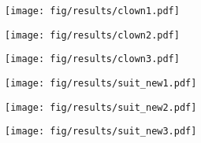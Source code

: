 \begin{figure*}
    \begin{subfigure}{0.33\linewidth}
        \begin{minipage}[t]{1.0\linewidth}
            \centering
            \texttt{[image: fig/results/clown1.pdf]}
        \end{minipage}
    \end{subfigure}
    \hfill
    \begin{subfigure}{0.33\linewidth}
        \begin{minipage}[t]{1.0\linewidth}
            \centering
            \texttt{[image: fig/results/clown2.pdf]}
        \end{minipage}
    \end{subfigure}
    \hfill
    \begin{subfigure}{0.33\linewidth}
        \begin{minipage}[t]{1.0\linewidth}
            \centering
            \texttt{[image: fig/results/clown3.pdf]}
        \end{minipage}
    \end{subfigure}

    \begin{subfigure}{0.33\linewidth}
        \begin{minipage}[t]{1.0\linewidth}
            \centering
            \texttt{[image: fig/results/suit\_new1.pdf]}
        \end{minipage}
    \end{subfigure}
    \hfill
    \begin{subfigure}{0.33\linewidth}
        \begin{minipage}[t]{1.0\linewidth}
            \centering
            \texttt{[image: fig/results/suit\_new2.pdf]}
        \end{minipage}
    \end{subfigure}
    \hfill
    \begin{subfigure}{0.33\linewidth}
        \begin{minipage}[t]{1.0\linewidth}
            \centering
            \texttt{[image: fig/results/suit\_new3.pdf]}
        \end{minipage}
    \end{subfigure}


\end{figure*}
